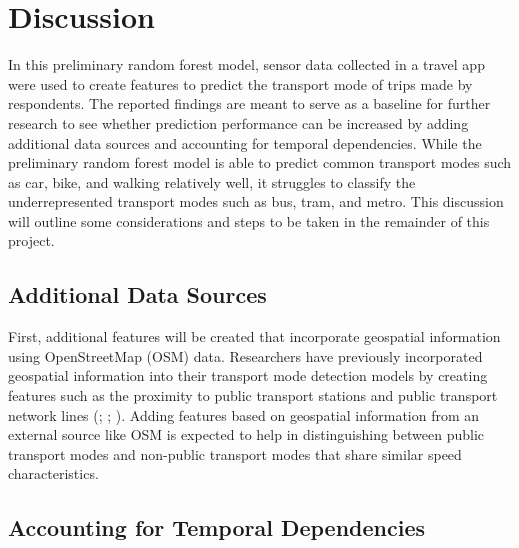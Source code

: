 \documentclass[10pt, a4paper, titlepage, hidelinks]{article}
\begin{document}
\section{Discussion}

In this preliminary random forest model, sensor data collected in a travel app were used to create features to predict the transport mode of trips made by respondents. The reported findings are meant to serve as a baseline for further research to see whether prediction performance can be increased by adding additional data sources and accounting for temporal dependencies. While the preliminary random forest model is able to predict common transport modes such as car, bike, and walking relatively well, it struggles to classify the underrepresented transport modes such as bus, tram, and metro. This discussion will outline some considerations and steps to be taken in the remainder of this project.

\subsection{Additional Data Sources}

First, additional features will be created that incorporate geospatial information using OpenStreetMap (OSM) data. Researchers have previously incorporated geospatial information into their transport mode detection models by creating features such as the proximity to public transport stations and public transport network lines (\cite{liu2022}; \cite{li2021}; \cite{nour2016}). Adding features based on geospatial information from an external source like OSM is expected to help in distinguishing between public transport modes and non-public transport modes that share similar speed characteristics.


\subsection{Accounting for Temporal Dependencies}
\end{document}

